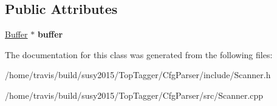 \subsection*{Public Attributes}
\begin{DoxyCompactItemize}
\item 
\hypertarget{classhcalcfg_1_1Scanner_a1a1d98f64af0e4c5d12a652c1596f85c}{\hyperlink{classhcalcfg_1_1Buffer}{Buffer} $\ast$ {\bfseries buffer}}\label{classhcalcfg_1_1Scanner_a1a1d98f64af0e4c5d12a652c1596f85c}

\end{DoxyCompactItemize}


The documentation for this class was generated from the following files\-:\begin{DoxyCompactItemize}
\item 
/home/travis/build/susy2015/\-Top\-Tagger/\-Cfg\-Parser/include/Scanner.\-h\item 
/home/travis/build/susy2015/\-Top\-Tagger/\-Cfg\-Parser/src/Scanner.\-cpp\end{DoxyCompactItemize}
